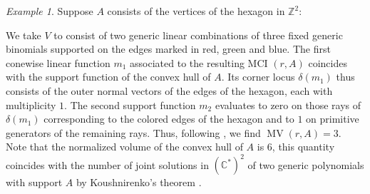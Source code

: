 \documentclass[a4paper]{article}
\theoremstyle{remark}
\newtheorem{example}{Example}
\def\CC{\mathbb{C}}
\def\ZZ{\mathbb{Z}}
\def\corn{\delta}
\DeclareMathOperator{\mv}{MV}
\begin{document}
\begin{example}
  \label{ex:hexagon}
  Suppose $A$ consists of the vertices of the hexagon in $\ZZ^2$:
  
  \begin{center}
  \end{center}

  We take $V$ to consist of two generic linear combinations of three
  fixed generic binomials supported on the edges marked in red, green
  and blue. The first conewise linear function $m_1$ associated to the
  resulting MCI $(r,A)$ coincides with the support function of the
  convex hull of $A$.  Its corner locus $\corn(m_1)$ thus consists of
  the outer normal vectors of the edges of the hexagon, each with
  multiplicity $1$. The second support function $m_2$ evaluates to
  zero on those rays of $\corn(m_1)$ corresponding to the colored
  edges of the hexagon and to $1$ on primitive generators of the
  remaining rays. Thus, following , we find
  $\mv(r,A) = 3$. Note that the normalized volume of the convex hull
  of $A$ is $6$, this quantity coincides with the number of joint
  solutions in $(\CC^{*})^2$ of two generic polynomials with support
  $A$ by Koushnirenko's theorem \cite{kouchnirenko1976}.
\end{example}
\end{document}
